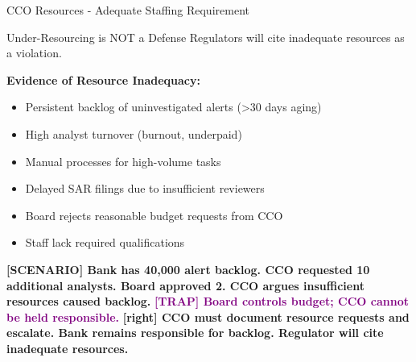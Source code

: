 \documentclass[11pt,a4paper]{beamer}
\newcommand{\trap}[1]{\textcolor{purple}{\textbf{[TRAP] #1}}}
\newcommand{\correct}[1]{\textcolor{green!50!black}{\textbf{[right] #1}}}
\newcommand{\scenario}[1]{\textcolor{blue!70!black}{\textbf{[SCENARIO] #1}}}
\begin{document}
\begin{frame}{CCO Resources - Adequate Staffing Requirement}
\begin{block}{Under-Resourcing is NOT a Defense}
Regulators will cite inadequate resources as a violation.
\end{block}
\textbf{Evidence of Resource Inadequacy:}
\begin{itemize}
\item Persistent backlog of uninvestigated alerts (>30 days aging)
\item High analyst turnover (burnout, underpaid)
\item Manual processes for high-volume tasks
\item Delayed SAR filings due to insufficient reviewers
\item Board rejects reasonable budget requests from CCO
\item Staff lack required qualifications
\end{itemize}
\scenario{Bank has 40,000 alert backlog. CCO requested 10 additional analysts. Board approved 2. CCO argues insufficient resources caused backlog.}
\trap{Board controls budget; CCO cannot be held responsible.}
\correct{CCO must document resource requests and escalate. Bank remains responsible for backlog. Regulator will cite inadequate resources.}
\end{frame}

\end{document}
